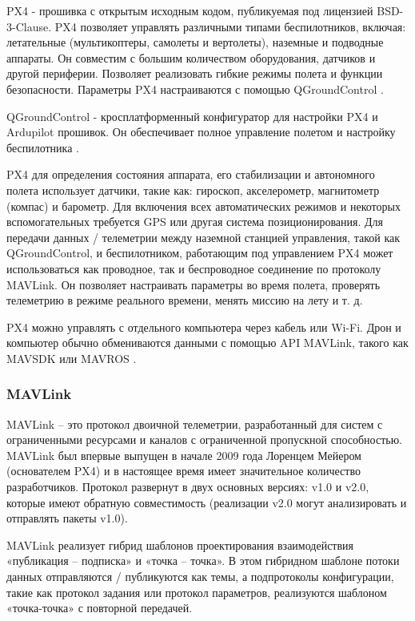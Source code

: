 PX4 - прошивка с открытым исходным кодом, публикуемая под лицензией BSD-3-Clause. PX4 позволяет управлять различными типами беспилотников, включая: летательные (мультикоптеры, самолеты и вертолеты), наземные и подводные аппараты. Он совместим с большим количеством оборудования, датчиков и другой периферии. Позволяет реализовать гибкие режимы полета и функции безопасности.
Параметры PX4 настраиваются с помощью Q\-Ground\-Control \cite{px4}.

QGroundControl - кросплатформенный конфигуратор для настройки PX4 и Ardupilot прошивок. Он обеспечивает полное управление полетом и настройку беспилотника \cite{qgroundcontrol}.

PX4 для определения состояния аппарата, его стабилизации и автономного полета использует датчики, такие как: гироскоп, акселерометр, магнитометр (компас) и барометр. Для включения всех автоматических режимов и некоторых вспомогательных требуется GPS или другая система позиционирования.
Для передачи данных / телеметрии между наземной станцией управления, такой как Q\-Ground\-Control, и беспилотником, работающим под управлением PX4 может использоваться как проводное, так и беспроводное соединение по протоколу MAVLink. Он позволяет настраивать параметры во время полета, проверять телеметрию в режиме реального времени, менять миссию на лету и т. д.

PX4 можно управлять с отдельного компьютера через кабель или Wi-Fi. Дрон и компьютер обычно обмениваются данными с помощью API MAVLink, такого как MAVSDK или MAVROS \cite{px4}.

\subsubsection{MAVLink}


MAVLink -- это протокол двоичной телеметрии, разработанный для систем с ограниченными ресурсами и каналов с ограниченной пропускной способностью. MAVLink был впервые выпущен в начале 2009 года Лоренцем Мейером (основателем PX4) и в настоящее время имеет значительное количество разработчиков. Протокол развернут в двух основных версиях: v1.0 и v2.0, которые имеют обратную совместимость (реализации v2.0 могут анализировать и отправлять пакеты v1.0).

MAVLink реализует гибрид шаблонов проектирования взаимодействия «публикация -- подписка» и «точка -- точка». В этом гибридном шаблоне потоки данных отправляются / публикуются как темы, а подпротоколы конфигурации, такие как протокол задания или протокол параметров, реализуются шаблоном «точка-точка» с повторной передачей.

